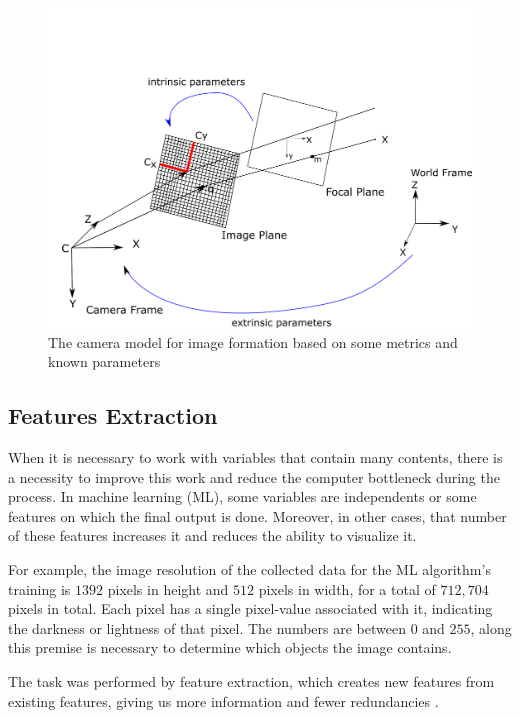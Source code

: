 \begin{figure}[H]
\centering
\includegraphics[width=\textwidth]{imagens/image_formation.png}
\caption{The camera model for image formation based on some metrics and known parameters}
\label{fig:image_formation}
\end{figure}

\subsection{Features Extraction}

When it is necessary to work with variables that contain many contents, there is a necessity to improve this work and reduce the computer bottleneck during the process. In machine learning (ML), some variables are independents or some features on which the final output is done. Moreover, in other cases, that number of these features increases it and reduces the ability to visualize it. 

For example, the image resolution of the collected data for the ML algorithm's training is $1392$ pixels in height and $512$ pixels in width, for a total of $712,704$ pixels in total. Each pixel has a single pixel-value associated with it, indicating the darkness or lightness of that pixel. The numbers are between $0$ and $255$, along this premise is necessary to determine which objects the image contains.

The task was performed by feature extraction, which creates new features from existing features, giving us more information and fewer redundancies \cite{wang2019data}.

